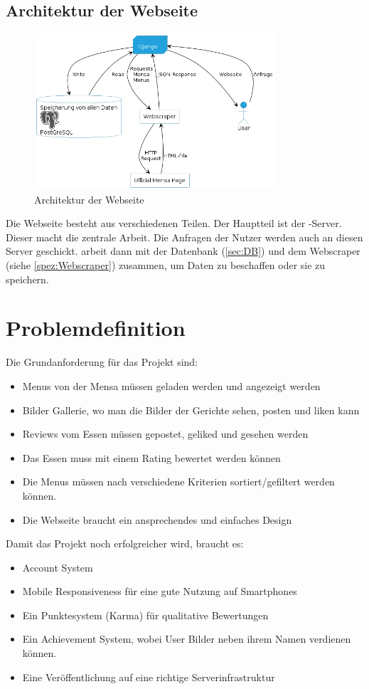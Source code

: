 \subsection{Architektur der Webseite}
\begin{figure}[ht]
    \centering
    \includegraphics[width=0.8\textwidth]{images/Webseite.png}
    \caption{Architektur der Webseite}
    \label{fig:Website}
\end{figure}

Die Webseite besteht aus verschiedenen Teilen. Der Hauptteil ist der
-Server. Dieser macht die zentrale Arbeit. Die Anfragen der Nutzer
werden auch an diesen Server geschickt.  arbeit dann mit der
Datenbank (\ref{sec:DB}) und dem Webscraper (siehe \ref{spez:Webscraper})
zusammen, um Daten zu beschaffen oder sie zu speichern.

\section{Problemdefinition}\label{sec:problemdefinition}

Die Grundanforderung für das Projekt sind:
\begin{itemize}
    \item Menus von der Mensa müssen geladen werden und angezeigt werden
    \item Bilder Gallerie, wo man die Bilder der Gerichte sehen, posten und liken kann
    \item Reviews vom Essen müssen gepostet, geliked und gesehen werden
    \item Das Essen muss mit einem Rating bewertet werden können
    \item Die Menus müssen nach verschiedene Kriterien sortiert/gefiltert werden können.
    \item Die Webseite braucht ein ansprechendes und einfaches Design
\end{itemize}

Damit das Projekt noch erfolgreicher wird, braucht es:
\begin{itemize}
    \item Account System
    \item Mobile Responsiveness für eine gute Nutzung auf Smartphones
    \item Ein Punktesystem (Karma) für qualitative Bewertungen
    \item Ein Achievement System, wobei User Bilder neben ihrem Namen verdienen können.
    \item Eine Veröffentlichung auf eine richtige Serverinfrastruktur
\end{itemize}

